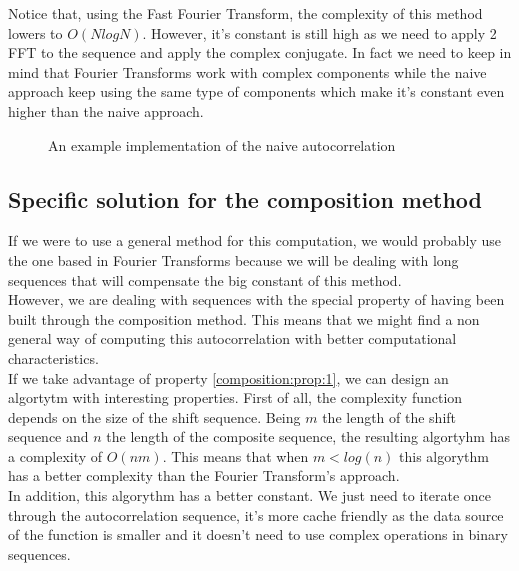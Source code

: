         Notice that, using the Fast Fourier
        Transform\cite{fast_fourier_transform}, the complexity of this
        method lowers to $O(N log N)$. However, it's constant is
        still high as we need to apply 2 FFT to the sequence and apply the
        complex conjugate. In fact we need to keep in mind that Fourier
        Transforms work with complex components while the naive approach keep
        using the same type of components which make it's constant even higher
        than the naive approach.

          \begin{figure}
            \caption{An example implementation of the naive autocorrelation}
            \label{naive_auto:fig:1}
          \end{figure}

      \subsection{Specific solution for the composition method}

      If we were to use a general method for this computation, we would probably
      use the one based in Fourier Transforms because we will be dealing with
      long sequences that will compensate the big constant of this method.\\

      However, we are dealing with sequences with the special property of
      having been built through the composition method. This means that we
      might find a non general way of computing this autocorrelation with better
      computational characteristics.\\

      If we take advantage of property \ref{composition:prop:1}, we can design
      an algortytm with interesting properties. First of all, the complexity
      function depends on the size of the shift sequence. Being $m$ the
      length of the shift sequence and $n$ the length of the composite
      sequence, the resulting algortyhm has a complexity of $O(nm)$. This means
      that when $m < log(n)$ this algorythm has a better complexity than the
      Fourier Transform's approach.\\

      In addition, this algorythm has a better constant. We just need to
      iterate once through the autocorrelation sequence, it's more cache
      friendly as the data source of the function is smaller and it doesn't
      need to use complex operations in binary sequences.\\

